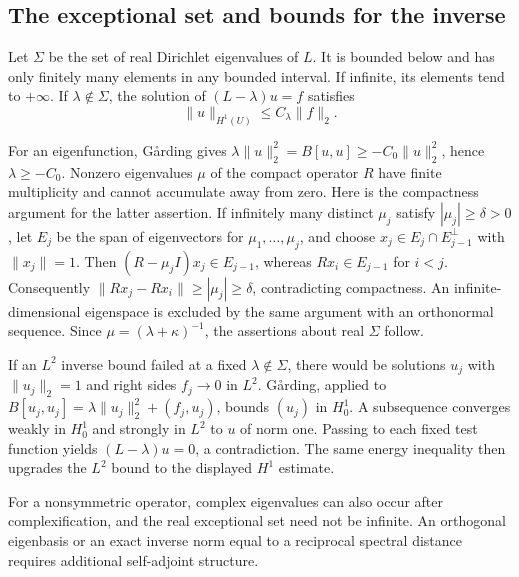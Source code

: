 \subsection{The exceptional set and bounds for the inverse}
\begin{theorem}\label{thm:6-discrete}
Let $\Sigma$ be the set of real Dirichlet eigenvalues of $L$.
It is bounded below and has only finitely many elements in any bounded
interval. If infinite, its elements tend to $+\infty$.
If $\lambda\notin\Sigma$, the solution of $(L-\lambda)u=f$ satisfies
\[
 \|u\|_{H^1(U)}\leq C_\lambda\|f\|_2.
\]
\end{theorem}
\begin{expandedproof}
For an eigenfunction, G{\aa}rding gives
$\lambda\|u\|_2^2=B[u,u]\geq-C_0\|u\|_2^2$, hence $\lambda\geq-C_0$.
Nonzero eigenvalues $\mu$ of the compact operator $R$ have finite
multiplicity and cannot accumulate away from zero.
Here is the compactness argument for the latter assertion. If infinitely
many distinct $\mu_j$ satisfy $|\mu_j|\geq\delta>0$, let $E_j$ be the
span of eigenvectors for $\mu_1,\ldots,\mu_j$, and choose
$x_j\in E_j\cap E_{j-1}^\perp$ with $\|x_j\|=1$.
Then $(R-\mu_j I)x_j\in E_{j-1}$, whereas $Rx_i\in E_{j-1}$ for $i<j$.
Consequently $\|Rx_j-Rx_i\|\geq|\mu_j|\geq\delta$, contradicting
compactness. An infinite-dimensional eigenspace is excluded by the
same argument with an orthonormal sequence.
Since $\mu=(\lambda+\kappa)^{-1}$, the assertions about real $\Sigma$ follow.

If an $L^2$ inverse bound failed at a fixed $\lambda\notin\Sigma$,
there would be solutions $u_j$ with $\|u_j\|_2=1$ and right sides
$f_j\to0$ in $L^2$. G{\aa}rding, applied to
$B[u_j,u_j]=\lambda\|u_j\|_2^2+(f_j,u_j)$, bounds $(u_j)$ in $H^1_0$.
A subsequence converges weakly in $H^1_0$ and strongly in $L^2$ to
$u$ of norm one. Passing to each fixed test function yields
$(L-\lambda)u=0$, a contradiction. The same energy inequality then
upgrades the $L^2$ bound to the displayed $H^1$ estimate.
\end{expandedproof}
\Needspace{45mm}
For a nonsymmetric operator, complex eigenvalues can also occur after
complexification, and the real exceptional set need not be infinite.
An orthogonal eigenbasis or an exact inverse norm equal to a reciprocal
spectral distance requires additional self-adjoint structure.